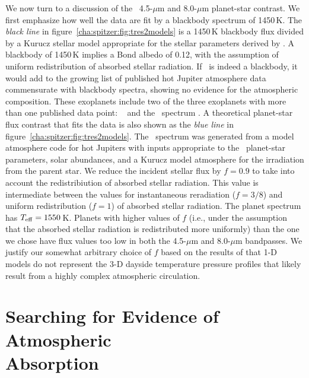 We now turn to a discussion of the \tresTwo\ 4.5-$\mu$m and 8.0-$\mu$m planet-star contrast.
We first emphasize how well the data are fit by a blackbody spectrum of 1450\,K.
The {\it black line} in figure~\ref{cha:spitzer:fig:tres2models} is a 1450\,K blackbody flux divided by a Kurucz stellar model appropriate for the stellar parameters derived by \citet{Sozzetti_Torres_Charbonneau:apj:2007a}. 
A blackbody of 1450\,K implies a Bond albedo of 0.12, with the assumption of uniform redistribution of absorbed stellar radiation.
If \tresTwo\ is indeed a blackbody, it would add to the growing list of published hot Jupiter atmosphere data commensurate with blackbody spectra, showing no evidence for the atmospheric composition. 
These exoplanets include two of the three exoplanets with more than one published data point: \tresOne\ \citep{Charbonneau_Allen_Megeath:apj:2005a} and the \hdOENb\ spectrum \citep{Grillmair_Charbonneau_Burrows:apjl:2007a}.
A theoretical planet-star flux contrast that fits the data is also shown as the {\it blue line} in figure~\ref{cha:spitzer:fig:tres2models}.
The \tresTwo\ spectrum was generated from a model atmosphere code for hot Jupiters \citep{Seager_Richardson_Hansen:apj:2005a} with inputs appropriate to the \tresTwo\ planet-star parameters, solar abundances, and a Kurucz model atmosphere for the irradiation from the parent star. 
We reduce the incident stellar flux by \mbox{$f=0.9$} to take into account the redistribiution of absorbed stellar radiation.
This value is intermediate between the values for instantaneous reradiation (\mbox{$f=3/8$}) and uniform redistribution (\mbox{$f=1$}) of absorbed stellar radiation.
The planet spectrum has \mbox{$T_{\rm eff}=1550$\,K}. 
Planets with higher values of $f$ (i.e., under the assumption that the absorbed stellar radiation is redistributed more uniformly) than the one we chose have flux values too low in both the 4.5-$\mu$m and 8.0-$\mu$m bandpasses. 
We justify our somewhat arbitrary choice of $f$ based on the results of \citet{Fortney_Cooper_Showman:apj:2006a} that 1-D models do not represent the 3-D dayside temperature pressure profiles that likely result from a highly complex atmospheric circulation. 

\section[Searching for Evidence of Atmospheric Absorption]{Searching for Evidence of Atmospheric \\ Absorption}
\label{cha:spitzer:sec:discuss}

